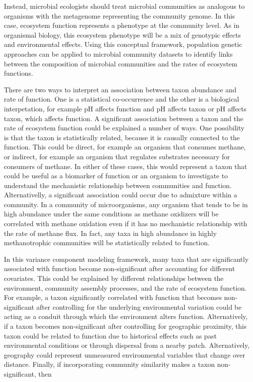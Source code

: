 \documentclass{article}
\begin{document}
Instead, microbial ecologists should treat microbial communities as analogous to
organisms with the metagenome representing the community genome. In this case,
ecosystem function represents a phenotype at the community level. As in
organismal biology, this ecosystem phenotype will be a mix of genotypic effects and
environmental effects. Using this conceptual framework, population genetic
approaches can be applied to microbial community datasets to identify  links
between the composition of microbial communities and the rates of ecosystem
functions.

There are two ways to interpret an association between taxon abundance and rate
of function. One is a statistical co-occurrence and the other is a biological
interpetation, for example pH affects function and pH affects taxon or pH
affects taxon, which affects function.
A significant association between a taxon and the rate of ecosystem function
could be explained a number of ways. One possibility is that the taxon is
statistically related, because it is causally connected to the function. This
could be direct, for example an organism that consumes methane, or indirect, for
example an organism that regulates substrates necessary for consumers of
methane. In either of these cases, this would represent a taxon that could be
useful as a biomarker of function or an organism to investigate to understand
the mechanistic relationship between communities and function. Alternativelly, a significant
association could occur due to admixture within a community. In a community of
microorganisms, any organism that tends to be in high abundance under the same
conditions as methane oxidizers will be correlated with methane oxidation even
if it has no mechanistic relationship with the rate of methane flux. In fact,
any taxa in high abundance in highly methanotrophic communities will be
statistically related to function.

In this variance component modeling framework, many taxa that are significantly
associated with function become non-significant after accounting for different
covariates. This could be explained by different relationships between the
environment, community assembly processes, and the rate of ecosystem function.
For example, a taxon significantly correlated with function that becomes
non-significant after controlling for the underlying environmental variation
could be acting as a conduit through which the environment alters function.
Alternatively, if a taxon becomes non-significant after controlling for
geographic proximity, this taxon could be related to function due to historical
effects such as past environmental conditions or through dispersal from a nearby
patch. Alternatively, geography could represent unmeasured environmental
variables that change over distance. Finally, if incorporating community
similarity makes a taxon non-significant, then 
\end{document}
